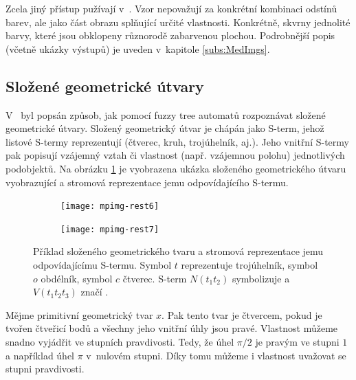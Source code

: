 Zcela jiný přístup pužívají v~\cite{WanJiaZhoDu-ImProcBasFuzCelAuMod}. Vzor nepovažují za konkrétní kombinaci odstínů barev, ale jako část obrazu splňující určité vlastnosti. Konkrétně, skvrny jednolité barvy, které jsou obklopeny různorodě zabarvenou plochou. Podrobnější popis (včetně ukázky výstupů) je uveden v~kapitole \ref{subs:MedImgs}.

\subsection{Složené geometrické útvary} \label{subs:CompGeoms}

V~\cite{Lee-FuzTreAutSynPatRec} byl popsán způsob, jak pomocí fuzzy tree automatů rozpoznávat složené geometrické útvary. Složený geometrický útvar je chápán jako S-term, jehož listové S-termy reprezentují  (čtverec, kruh, trojúhelník, aj.). Jeho vnitřní S-termy pak popisují vzájemný vztah či vlastnost (např. vzájemnou polohu) jednotlivých podobjektů. Na obrázku \ref{img:Geoms} je vyobrazena ukázka složeného geometrického útvaru vyobrazující  a stromová reprezentace jemu odpovídajícího S-termu.


\begin{figure} 
 \begin{subfigure}{0.4\textwidth}
  \texttt{[image: mpimg-rest6]}
 \end{subfigure}
 \begin{subfigure}{0.4\textwidth}
  \texttt{[image: mpimg-rest7]}
 \end{subfigure}
 
 \caption[Příklad složeného geometrického tvaru]{Příklad složeného geometrického tvaru a stromová reprezentace jemu odpovídajícímu S-termu. Symbol $t$ reprezentuje trojúhelník, symbol $o$ obdélník, symbol $c$ čtverec. S-term $N(t_1 t_2)$ symbolizuje  a $V(t_1 t_2 t_3)$ značí .} \label{img:Geoms}
\end{figure}

Mějme primitivní geometrický tvar $x$. Pak tento tvar je čtvercem, pokud je tvořen čtveřicí bodů a všechny jeho vnitřní úhly jsou pravé. Vlastnost  můžeme snadno vyjádřit ve stupních pravdivosti. Tedy, že úhel $\pi/2$ je pravým ve stupni $1$ a například úhel $\pi$ v~nulovém stupni. Díky tomu můžeme i vlastnost  uvažovat se stupni pravdivosti.

